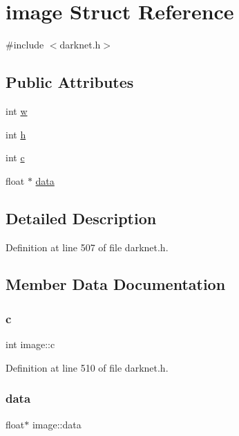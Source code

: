 \hypertarget{structimage}{}\section{image Struct Reference}
\label{structimage}


{\ttfamily \#include $<$darknet.\+h$>$}

\subsection*{Public Attributes}
\begin{DoxyCompactItemize}
\item 
int \mbox{\hyperlink{structimage_aa6480e4024a0d5ca8d36b4145b3ceb43}{w}}
\item 
int \mbox{\hyperlink{structimage_a30e2caee481a59608823b3bcec8a139f}{h}}
\item 
int \mbox{\hyperlink{structimage_aa67d2491c4d17dd240453d69dfc99482}{c}}
\item 
float $\ast$ \mbox{\hyperlink{structimage_aed7e0704080213b735419d6661251a0a}{data}}
\end{DoxyCompactItemize}


\subsection{Detailed Description}


Definition at line 507 of file darknet.\+h.



\subsection{Member Data Documentation}
\mbox{\label{structimage_aa67d2491c4d17dd240453d69dfc99482}} 
\subsubsection{\texorpdfstring{c}{c}}
{\footnotesize\ttfamily int image\+::c}



Definition at line 510 of file darknet.\+h.

\mbox{\label{structimage_aed7e0704080213b735419d6661251a0a}} 
\subsubsection{\texorpdfstring{data}{data}}
{\footnotesize\ttfamily float$\ast$ image\+::data}



